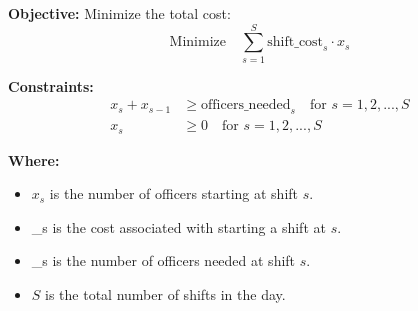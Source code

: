 \documentclass{article}
\begin{document}
\textbf{Objective:}
Minimize the total cost:
\[
\text{Minimize} \quad \sum_{s=1}^{S} \text{shift\_cost}_s \cdot x_s
\]

\textbf{Constraints:}
\begin{align*}
x_s + x_{s-1} & \geq \text{officers\_needed}_s \quad \text{for } s = 1, 2, ..., S \\
x_s & \geq 0 \quad \text{for } s = 1, 2, ..., S
\end{align*}

\textbf{Where:}
\begin{itemize}
    \item \( x_s \) is the number of officers starting at shift \( s \).
    \item {}_s is the cost associated with starting a shift at \( s \).
    \item {}_s is the number of officers needed at shift \( s \).
    \item \( S \) is the total number of shifts in the day.
\end{itemize}
\end{document}
